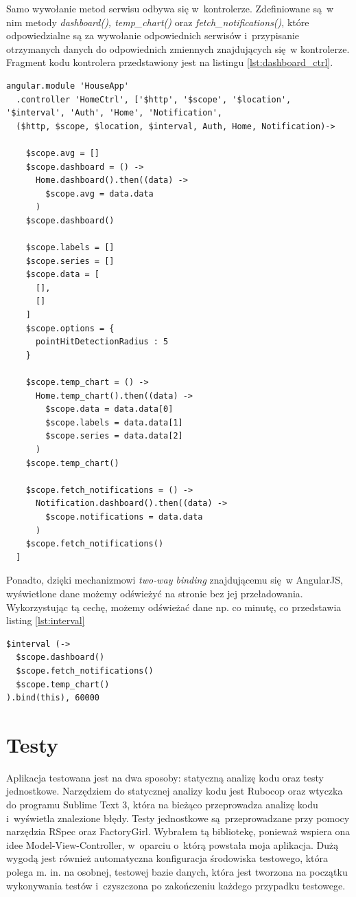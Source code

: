 \documentclass[eng,oneside]{mgr}
\begin{document}
Samo wywołanie metod serwisu odbywa się w~kontrolerze. Zdefiniowane są w nim metody \emph{dashboard(), temp\_chart()} oraz \emph{fetch\_notifications()}, które odpowiedzialne są za wywołanie odpowiednich serwisów i~przypisanie otrzymanych danych do odpowiednich zmiennych znajdujących się w kontrolerze. Fragment kodu kontrolera przedstawiony jest na listingu \ref{lst:dashboard_ctrl}.
\begin{lstlisting}[caption={HomeController.},label=lst:dashboard_ctrl]
angular.module 'HouseApp'
  .controller 'HomeCtrl', ['$http', '$scope', '$location', '$interval', 'Auth', 'Home', 'Notification',
  ($http, $scope, $location, $interval, Auth, Home, Notification)->
  
    $scope.avg = []
    $scope.dashboard = () ->
      Home.dashboard().then((data) ->
        $scope.avg = data.data
      )
    $scope.dashboard()

    $scope.labels = []
    $scope.series = []
    $scope.data = [
      [],
      []
    ]
    $scope.options = {
      pointHitDetectionRadius : 5
    }

    $scope.temp_chart = () ->
      Home.temp_chart().then((data) ->
        $scope.data = data.data[0]
        $scope.labels = data.data[1]
        $scope.series = data.data[2]
      )
    $scope.temp_chart()

    $scope.fetch_notifications = () ->
      Notification.dashboard().then((data) ->
        $scope.notifications = data.data
      )
    $scope.fetch_notifications()
  ]
\end{lstlisting}

Ponadto, dzięki mechanizmowi \emph{two-way binding} znajdującemu się w AngularJS, wyświetlone dane możemy odświeżyć na stronie bez jej przeładowania. Wykorzystując tą cechę, możemy odświeżać dane np. co minutę, co przedstawia listing \ref{lst:interval}
\begin{lstlisting}[caption={Odświeżanie danych co wybrany okres czasu.},label=lst:interval]
$interval (->
  $scope.dashboard()
  $scope.fetch_notifications()
  $scope.temp_chart()
).bind(this), 60000  
\end{lstlisting}

\chapter{Testy} %
\label{cha:testy}
Aplikacja testowana jest na dwa sposoby: statyczną analizę kodu oraz testy jednostkowe. Narzędziem do statycznej analizy kodu jest Rubocop oraz wtyczka do programu Sublime Text 3, która na bieżąco przeprowadza analizę kodu i~wyświetla znalezione błędy. Testy jednostkowe są przeprowadzane przy pomocy narzędzia RSpec oraz FactoryGirl. 
Wybrałem tą bibliotekę, ponieważ wspiera ona idee Model-View-Controller, w~oparciu o~którą powstała moja aplikacja. Dużą wygodą jest również automatyczna konfiguracja środowiska testowego, która polega m. in.  na osobnej, testowej bazie danych, która jest tworzona na początku wykonywania testów i~czyszczona po zakończeniu każdego przypadku testowege.
\end{document}
